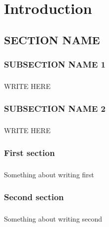\chapter{Introduction}
\section{SECTION NAME}
\subsection{SUBSECTION NAME 1}
\paragraph{}WRITE HERE



\subsection{SUBSECTION NAME 2}
\paragraph{}WRITE HERE

\subsection{First section }
\paragraph{} Something about writing first 

\subsection{Second section }
\paragraph{} Something about writing second 


